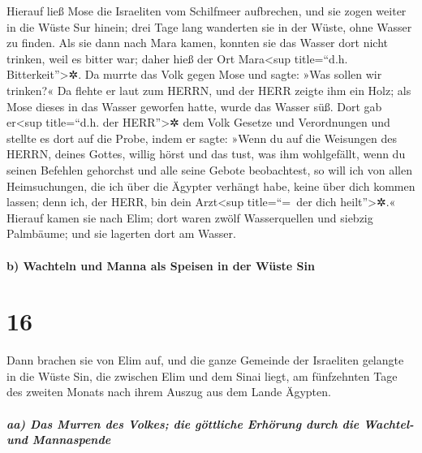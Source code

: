  Hierauf ließ Mose die Israeliten vom Schilfmeer
aufbrechen, und sie zogen weiter in die Wüste Sur hinein; drei Tage lang
wanderten sie in der Wüste, ohne Wasser zu finden.  Als
sie dann nach Mara kamen, konnten sie das Wasser dort nicht trinken,
weil es bitter war; daher hieß der Ort Mara\textless sup title=``d.h.
Bitterkeit''\textgreater✲.  Da murrte das Volk gegen Mose
und sagte: »Was sollen wir trinken?«  Da flehte er laut
zum HERRN, und der HERR zeigte ihm ein Holz; als Mose dieses in das
Wasser geworfen hatte, wurde das Wasser süß. Dort gab er\textless sup
title=``d.h. der HERR''\textgreater✲ dem Volk Gesetze und Verordnungen
und stellte es dort auf die Probe,  indem er sagte: »Wenn
du auf die Weisungen des HERRN, deines Gottes, willig hörst und das
tust, was ihm wohlgefällt, wenn du seinen Befehlen gehorchst und alle
seine Gebote beobachtest, so will ich von allen Heimsuchungen, die ich
über die Ägypter verhängt habe, keine über dich kommen lassen; denn ich,
der HERR, bin dein Arzt\textless sup title=``=~der dich
heilt''\textgreater✲.«  Hierauf kamen sie nach Elim; dort
waren zwölf Wasserquellen und siebzig Palmbäume; und sie lagerten dort
am Wasser.

\hypertarget{b-wachteln-und-manna-als-speisen-in-der-wuxfcste-sin}{%
\paragraph{b) Wachteln und Manna als Speisen in der Wüste
Sin}\label{b-wachteln-und-manna-als-speisen-in-der-wuxfcste-sin}}

\hypertarget{section-15}{%
\section{16}\label{section-15}}

 Dann brachen sie von Elim auf, und die ganze Gemeinde der
Israeliten gelangte in die Wüste Sin, die zwischen Elim und dem Sinai
liegt, am fünfzehnten Tage des zweiten Monats nach ihrem Auszug aus dem
Lande Ägypten.

\hypertarget{aa-das-murren-des-volkes-die-guxf6ttliche-erhuxf6rung-durch-die-wachtel--und-mannaspende}{%
\subparagraph{aa) Das Murren des Volkes; die göttliche Erhörung durch
die Wachtel- und
Mannaspende}\label{aa-das-murren-des-volkes-die-guxf6ttliche-erhuxf6rung-durch-die-wachtel--und-mannaspende}}

